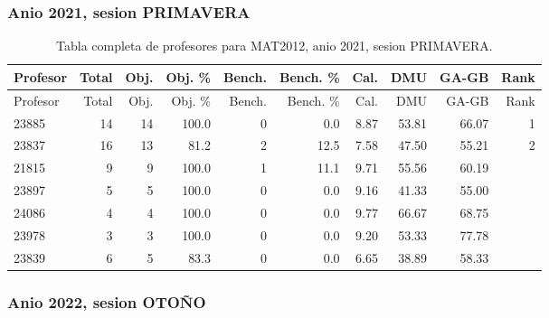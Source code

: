 \subsubsection{Anio 2021, sesion PRIMAVERA}

\begingroup
\scriptsize
\setlength{\tabcolsep}{3pt}
\begin{longtable}{lrrrrrrrrr}
\caption{Tabla completa de profesores para MAT2012, anio 2021, sesion PRIMAVERA.}\label{tab:prof-period-mat2012-2021-primavera}\\
\toprule
Profesor & Total & Obj. & Obj. \% & Bench. & Bench. \% & Cal. & DMU & GA-GB & Rank \\
\midrule
\endfirsthead
\toprule
Profesor & Total & Obj. & Obj. \% & Bench. & Bench. \% & Cal. & DMU & GA-GB & Rank \\
\midrule
\endhead
23885 & 14 & 14 & 100.0 & 0 & 0.0 & 8.87 & 53.81 & 66.07 & 1 \\
23837 & 16 & 13 & 81.2 & 2 & 12.5 & 7.58 & 47.50 & 55.21 & 2 \\
21815 & 9 & 9 & 100.0 & 1 & 11.1 & 9.71 & 55.56 & 60.19 &  \\
23897 & 5 & 5 & 100.0 & 0 & 0.0 & 9.16 & 41.33 & 55.00 &  \\
24086 & 4 & 4 & 100.0 & 0 & 0.0 & 9.77 & 66.67 & 68.75 &  \\
23978 & 3 & 3 & 100.0 & 0 & 0.0 & 9.20 & 53.33 & 77.78 &  \\
23839 & 6 & 5 & 83.3 & 0 & 0.0 & 6.65 & 38.89 & 58.33 &  \\
\bottomrule
\end{longtable}
\endgroup

\subsubsection{Anio 2022, sesion OTOÑO}

